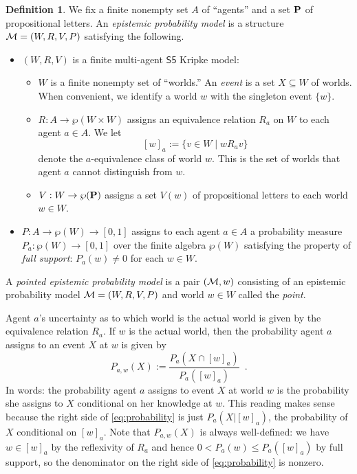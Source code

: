 \documentclass[12pt]{article}
\theoremstyle{definition}
\newtheorem{definition}[theorem]{Definition}
\newcommand{\M}{{\cal M}}      %
\newcommand{\Prop}{{\bf P}}    %
\begin{document}
\begin{definition}
  \label{definition:epistemic-probability-model}
  We fix a finite nonempty set $A$ of ``agents'' and a set $\Prop$ of
  propositional letters.  An \emph{epistemic probability model} is a
  structure $\M=(W,R,V,P)$ satisfying the following.
  \begin{itemize} 
  \item $(W,R,V)$ is a finite multi-agent $\mathsf{S5}$ Kripke model:
    \begin{itemize}
    \item $W$ is a finite nonempty set of ``worlds.''  An \emph{event}
      is a set $X\subseteq W$ of worlds.  When convenient, we identify a world
      $w$ with the singleton event $\{w\}$.
      
    \item $R:A\to\wp(W\times W)$ assigns an equivalence relation $R_a$
      on $W$ to each agent $a\in A$.  We let
      \[
      [w]_a:=\{v\in W\mid wR_av\}
      \]
      denote the $a$-equivalence class of world $w$.  This is the
      set of worlds that agent $a$ cannot distinguish from $w$.

    \item $V:W\to\wp(\Prop)$ assigns a set $V(w)$ of propositional
      letters to each world $w\in W$.
    \end{itemize}

  \item $P:A \to\wp(W)\to[0,1]$ assigns to each agent $a\in A$ a
    probability measure $P_a:\wp(W)\to[0,1]$ over the finite algebra
    $\wp(W)$ satisfying the property of \emph{full support\/}:
    $P_a(w)\neq0$ for each $w\in W$.
  \end{itemize}
  A \emph{pointed epistemic probability model} is a pair $(\M,w)$
  consisting of an epistemic probability model $\M=(W,R,V,P)$ and
  world $w\in W$ called the \emph{point}.
\end{definition}

Agent $a$'s uncertainty as to which world is the actual world
is given by the equivalence relation $R_a$. 
If $w$ is the actual world, then the probability agent
$a$ assigns to an event $X$ at $w$ is given by
\begin{equation}
  P_{a,w}(X) := \frac{P_a(X\cap[w]_a)}{P_a([w]_a)}\enspace.
  \label{eq:probability}
\end{equation}
In words: the probability agent $a$ assigns to event $X$ at
world $w$ is the probability she assigns to $X$ conditional
on her knowledge at $w$.  This
reading makes sense because the right side of \eqref{eq:probability}
is just $P_a(X|[w]_a)$, the probability of $X$ conditional on
$[w]_a$.  Note that $P_{a,w}(X)$ is always well-defined:
we have $w\in[w]_a$ by the reflexivity of
$R_a$ and hence
$0<P_a(w)\leq P_a([w]_a)$ by full support, so the denominator on the right side of 
\eqref{eq:probability} is nonzero.
\end{document}
